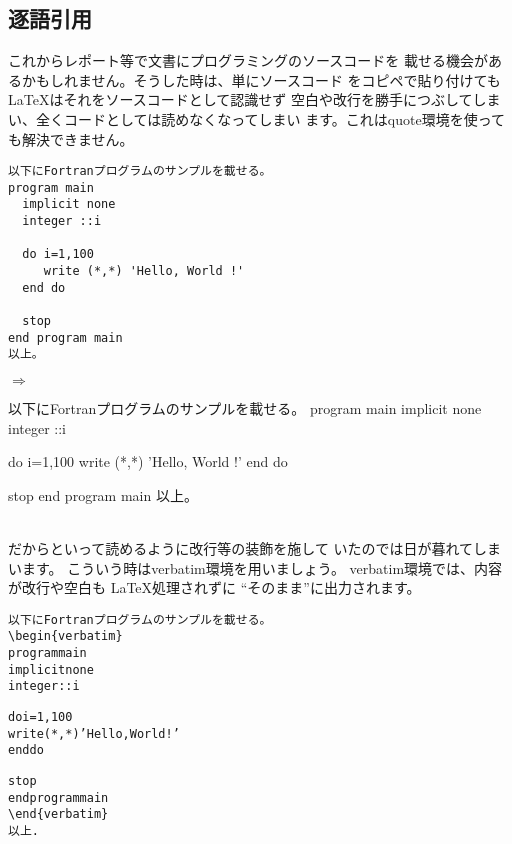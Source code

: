 \subsection{逐語引用}
これからレポート等で文書にプログラミングのソースコードを
載せる機会があるかもしれません。そうした時は、単にソースコード
をコピペで貼り付けても{\LaTeX}はそれをソースコードとして認識せず
空白や改行を勝手につぶしてしまい、全くコードとしては読めなくなってしまい
ます。これはquote環境を使っても解決できません。\\
\begin{minipage}[c]{.45\textwidth}
\begin{screen}
 \small
\begin{verbatim}
以下にFortranプログラムのサンプルを載せる。
program main
  implicit none
  integer ::i

  do i=1,100
     write (*,*) 'Hello, World !'
  end do

  stop
end program main
以上。
\end{verbatim}
\end{screen}
\end{minipage}%
$\Rightarrow$
\begin{minipage}{.50\textwidth}
\begin{shadebox}
以下にFortranプログラムのサンプルを載せる。
program main
  implicit none
  integer ::i

  do i=1,100
     write (*,*) 'Hello, World !'
  end do

  stop
end program main
以上。
\end{shadebox}
\end{minipage}
\vspace*{1mm}\\
だからといって読めるように改行等の装飾を施して
いたのでは日が暮れてしまいます。
こういう時はverbatim環境を用いましょう。
verbatim環境では、内容が改行や空白も
{\LaTeX}処理されずに
``そのまま''に出力されます。\\
\begin{minipage}[c]{.45\textwidth}
\begin{screen}
\small
\begin{alltt}
以下にFortranプログラムのサンプルを載せる。
\verb+\begin{verbatim}+
program main
  implicit none
  integer ::i

  do i=1,100
     write (*,*) 'Hello, World !'
  end do

  stop
end program main
\verb+\end{verbatim}+
以上.
\end{alltt}
\end{screen}
\end{minipage}
